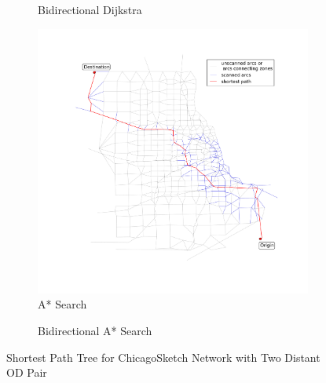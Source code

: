 \begin{figure}
\begin{subfigure}{.5\textwidth}
        \caption{Bidirectional Dijkstra}
        \label{fig:chicago_bidirect}
    \end{subfigure}
    \begin{subfigure}{.5\textwidth}
        \centering
        \includegraphics[width=\textwidth,trim=120px 120px 48px 0px,clip]{img/chicago_astar}
        \caption{A* Search}
        \label{fig:chicago_Astar_bidirect}
    \end{subfigure}%
    \begin{subfigure}{.5\textwidth}
        \centering
        \caption{Bidirectional A* Search}
        \label{fig:chicago_astar_bidirect}
    \end{subfigure}
    \vspace{1em}
    \caption{Shortest Path Tree for ChicagoSketch Network with Two Distant OD Pair}
    \label{fig:long_sptree}
\end{figure}

